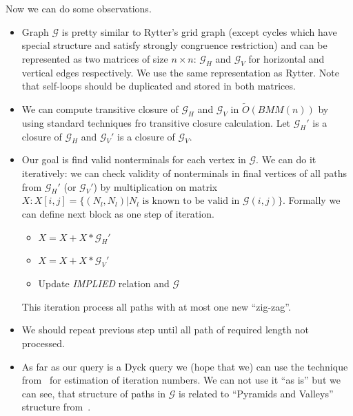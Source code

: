 Now we can do some observations.
\begin{itemize}
\item Graph $\mathcal{G}$ is pretty similar to Rytter's grid graph (except cycles which have special structure and satisfy strongly congruence restriction) and can be represented as two matrices of size $n \times n$: $\mathcal{G}_H$ and $\mathcal{G}_V$ for horizontal and vertical edges respectively. We use the same representation as Rytter.
Note that self-loops should be duplicated and stored in both matrices.
\item We can compute transitive closure of $\mathcal{G}_H$ and $\mathcal{G}_V$ in $\widetilde{O}(BMM(n))$ by using standard techniques fro transitive closure calculation.
Let $\mathcal{G}_H'$ is a closure of $\mathcal{G}_H$ and $\mathcal{G}_V'$ is a closure of $\mathcal{G}_V$.
\item Our goal is find valid nonterminals for each vertex in $\mathcal{G}$. 
We can do it iteratively: we can check validity of nonterminals in final vertices of all paths from $\mathcal{G}_H'$ (or $\mathcal{G}_V'$) by multiplication on matrix $X: X[i,j] = \{(N_l,N_l)| N_l \text{ is known to be valid in } \mathcal{G}(i,j)\}$.
Formally we can define next block as one step of iteration.
\begin{itemize}
\item $X = X + X * \mathcal{G}_H'$
\item $X = X + X * \mathcal{G}_V'$
\item Update \emph{IMPLIED} relation and $\mathcal{G}$
\end{itemize}

This iteration process all paths with at most one new ``zig-zag''.

\item We should repeat previous step until all path of required length not processed.
\item As far as our query is a Dyck query we (hope that we) can use the technique from~\cite{bradford2018} for estimation of iteration numbers.
We can not use it ``as is'' but we can see, that structure of paths in $\mathcal{G}$ is related to ``Pyramids and Valleys'' structure from~\cite{bradford2018}. 
\end{itemize}



